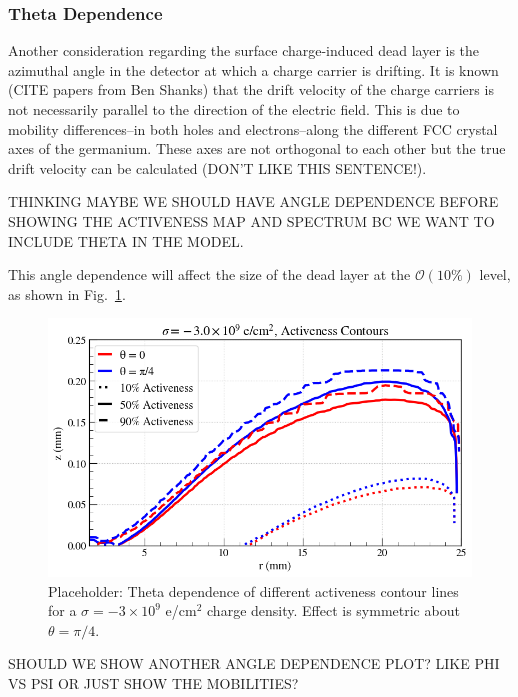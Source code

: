 \documentclass[nofootinbib,superscriptaddress, aps, prc, 
10pt, amsmath, amssymb, bibnotes,
altaffilletter, twocolumn, floatfix]{revtex4-2}
\begin{document}
    \subsubsection{Theta Dependence}

    Another consideration regarding the surface charge-induced dead layer is the azimuthal angle in the detector at which a charge carrier is drifting. It is known (CITE papers from Ben Shanks) that the drift velocity of the charge carriers is not necessarily parallel to the direction of the electric field. This is due to mobility differences--in both holes and electrons--along the different FCC crystal axes of the germanium. These axes are not orthogonal to each other but the true drift velocity can be calculated (DON'T LIKE THIS SENTENCE!). 

    THINKING MAYBE WE SHOULD HAVE ANGLE DEPENDENCE BEFORE SHOWING THE ACTIVENESS MAP AND SPECTRUM BC WE WANT TO INCLUDE THETA IN THE MODEL.

    This angle dependence will affect the size of the dead layer at the $\mathcal{O}(10\%)$ level, as shown in Fig.~\ref{fig:contours}.
    
    \begin{figure}
        \includegraphics[width=\columnwidth]{figures/minus3e9_contours_thetastudy.png}
        \caption{Placeholder: Theta dependence of different activeness contour lines for a $\sigma = -3 \times 10^{9}$ e/cm$^2$ charge density. Effect is symmetric about $\theta = \pi/4$.}
        \label{fig:contours}
    \end{figure}

    SHOULD WE SHOW ANOTHER ANGLE DEPENDENCE PLOT? LIKE PHI VS PSI OR JUST SHOW THE MOBILITIES?

    
\end{document}
